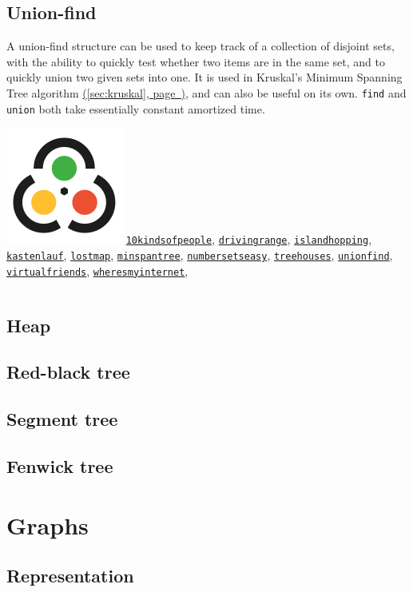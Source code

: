 \documentclass[10pt]{book}
\newcommand{\code}[1]{\inputminted[fontsize=\normalsize]{java}{code/#1}}
\newcommand*{\link}[1]{\hyperref[{#1}]{(\ref*{#1}, page~\pageref*{#1})}}
\newcommand{\kattis}[1]{\href{https://open.kattis.com/problems/#1}{\texttt{#1}}}
\begin{document}
\section{Union-find}

A union-find structure can be used to keep track of a collection of
disjoint sets, with the ability to quickly test whether two items are
in the same set, and to quickly union two given sets into one.  It is
used in Kruskal's Minimum Spanning Tree algorithm \link{sec:kruskal},
and can also be useful on its own.  \texttt{find} and \texttt{union}
both take essentially constant amortized time.

\includegraphics[height=0.9\baselineskip]{Kattis} \kattis{10kindsofpeople}, \kattis{drivingrange},
\kattis{islandhopping}, \kattis{kastenlauf}, \kattis{lostmap},
\kattis{minspantree}, \kattis{numbersetseasy}, \kattis{treehouses},
\kattis{unionfind}, \kattis{virtualfriends},
\kattis{wheresmyinternet},

\code{data-structures/UnionFind.java}

\section{Heap}

\section{Red-black tree}

\section{Segment tree}

\section{Fenwick tree}

\chapter{Graphs}

\section{Representation}
\end{document}
